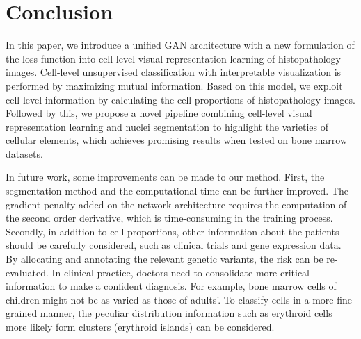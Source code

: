 \documentclass[journal]{IEEEtran}
\begin{document}
\section{Conclusion} 

In this paper, we introduce a unified GAN architecture with a new formulation of the loss function into cell-level visual representation learning of histopathology images. Cell-level unsupervised classification with interpretable visualization is performed by maximizing mutual information. Based on this model, we exploit cell-level information by calculating the cell proportions of histopathology images. Followed by this, we propose a novel pipeline combining cell-level visual representation learning and nuclei segmentation to highlight the varieties of cellular elements, which achieves promising results when tested on bone marrow datasets.

In future work, some improvements can be made to our method. First, the segmentation method and the computational time can be further improved. The gradient penalty added on the network architecture requires the computation of the second order derivative, which is time-consuming in the training process. Secondly, in addition to cell proportions, other information about the patients should be carefully considered, such as clinical trials and gene expression data. By allocating and annotating the relevant genetic variants, the risk can be re-evaluated. In clinical practice, doctors need to consolidate more critical information to make a confident diagnosis. For example, bone marrow cells of children might not be as varied as those of adults'. To classify cells in a more fine-grained manner, the peculiar distribution information such as erythroid cells more likely form clusters (erythroid islands) can be considered. 
\end{document}
